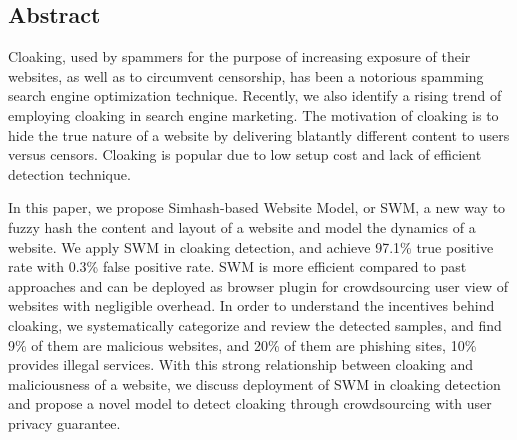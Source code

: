 
\subsection*{Abstract}
Cloaking, used by spammers for the purpose of increasing exposure of
their websites, as well as to circumvent censorship, has been a notorious 
spamming search engine optimization technique. Recently, we also
identify a rising trend of employing cloaking in search engine marketing. The motivation of cloaking 
is to hide the true nature of a website by delivering blatantly different 
content to users versus censors. Cloaking is popular due to low setup cost 
and lack of efficient detection technique. 

In this paper, we propose Simhash-based Website Model, or SWM, a new way to
fuzzy hash the content and layout of a
website and model the dynamics of a website. 
We apply SWM in cloaking detection, and achieve 97.1\% true positive rate with
0.3\% false positive rate. 
SWM is more efficient compared to past approaches and can be deployed as browser
plugin for crowdsourcing user view of websites with negligible overhead.
In order to understand the incentives
behind cloaking, we systematically
categorize and review the detected samples, and find 9\% of them are malicious
websites, and 20\% of them are phishing sites, 10\% provides illegal services. 
With this strong relationship between cloaking and maliciousness of a website,
we discuss deployment of SWM in cloaking detection and
propose a novel model to
detect cloaking through crowdsourcing with user privacy guarantee.

